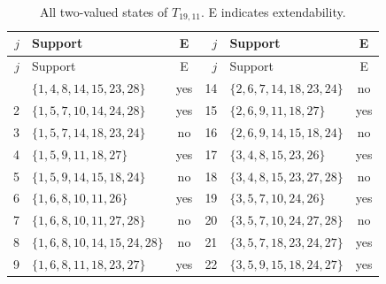 \documentclass[aps,pra,reprint,superscriptaddress,longbibliography,nofootinbib,floatfix,10pt]{revtex4-2}
\theoremstyle{definition}
\begin{document}
\begin{longtable}{rlc@{\qquad}rlc}
\caption{All two-valued states of $T_{19,11}$. E indicates extendability.}\label{tab:states-3e}\\\toprule $j$ & Support & E & $j$ & Support & E\\\midrule\endfirsthead
\toprule $j$ & Support & E & $j$ & Support & E\\\midrule\endhead\bottomrule\endfoot
1 & $\{1,\allowbreak 4,\allowbreak 8,\allowbreak 14,\allowbreak 15,\allowbreak 23,\allowbreak 28\}$ & yes & 14 & $\{2,\allowbreak 6,\allowbreak 7,\allowbreak 14,\allowbreak 18,\allowbreak 23,\allowbreak 24\}$ & no\\
2 & $\{1,\allowbreak 5,\allowbreak 7,\allowbreak 10,\allowbreak 14,\allowbreak 24,\allowbreak 28\}$ & yes & 15 & $\{2,\allowbreak 6,\allowbreak 9,\allowbreak 11,\allowbreak 18,\allowbreak 27\}$ & yes\\
3 & $\{1,\allowbreak 5,\allowbreak 7,\allowbreak 14,\allowbreak 18,\allowbreak 23,\allowbreak 24\}$ & no & 16 & $\{2,\allowbreak 6,\allowbreak 9,\allowbreak 14,\allowbreak 15,\allowbreak 18,\allowbreak 24\}$ & no\\
4 & $\{1,\allowbreak 5,\allowbreak 9,\allowbreak 11,\allowbreak 18,\allowbreak 27\}$ & yes & 17 & $\{3,\allowbreak 4,\allowbreak 8,\allowbreak 15,\allowbreak 23,\allowbreak 26\}$ & yes\\
5 & $\{1,\allowbreak 5,\allowbreak 9,\allowbreak 14,\allowbreak 15,\allowbreak 18,\allowbreak 24\}$ & no & 18 & $\{3,\allowbreak 4,\allowbreak 8,\allowbreak 15,\allowbreak 23,\allowbreak 27,\allowbreak 28\}$ & no\\
6 & $\{1,\allowbreak 6,\allowbreak 8,\allowbreak 10,\allowbreak 11,\allowbreak 26\}$ & yes & 19 & $\{3,\allowbreak 5,\allowbreak 7,\allowbreak 10,\allowbreak 24,\allowbreak 26\}$ & yes\\
7 & $\{1,\allowbreak 6,\allowbreak 8,\allowbreak 10,\allowbreak 11,\allowbreak 27,\allowbreak 28\}$ & no & 20 & $\{3,\allowbreak 5,\allowbreak 7,\allowbreak 10,\allowbreak 24,\allowbreak 27,\allowbreak 28\}$ & no\\
8 & $\{1,\allowbreak 6,\allowbreak 8,\allowbreak 10,\allowbreak 14,\allowbreak 15,\allowbreak 24,\allowbreak 28\}$ & no & 21 & $\{3,\allowbreak 5,\allowbreak 7,\allowbreak 18,\allowbreak 23,\allowbreak 24,\allowbreak 27\}$ & yes\\
9 & $\{1,\allowbreak 6,\allowbreak 8,\allowbreak 11,\allowbreak 18,\allowbreak 23,\allowbreak 27\}$ & yes & 22 & $\{3,\allowbreak 5,\allowbreak 9,\allowbreak 15,\allowbreak 18,\allowbreak 24,\allowbreak 27\}$ & yes\\

\end{longtable}
\end{document}
